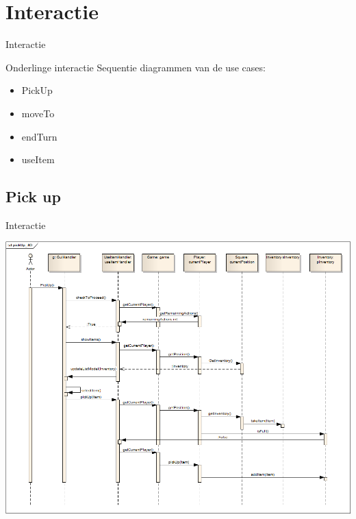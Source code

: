\documentclass[t]{beamer}
\begin{document}
\section{Interactie}
\begin{frame}{Interactie}
\begin{multicols}{2}
\tableofcontents[currentsection]
\end{multicols}
\end{frame}

\begin{frame}{Onderlinge interactie}
Sequentie diagrammen van de use cases:
\begin{itemize}
	\item PickUp
	\item moveTo
	\item endTurn
	\item useItem
\end{itemize}
\end{frame}

\subsection{Pick up}
\begin{frame}{Interactie}
\begin{multicols}{2}
\tableofcontents[currentsection]
\end{multicols}
\end{frame}

\begin{frame}[plain]
\begin{center}
\includegraphics[width= 0.90\linewidth]{../uml/pickup_SD.png}
\end{center}
\end{frame}
\end{document}
